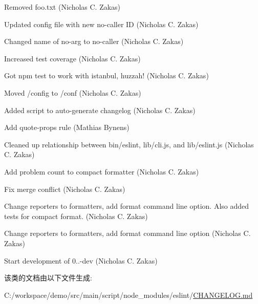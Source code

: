 \begin{DoxyItemize}
\item Removed foo.\+txt (Nicholas C. Zakas)
\item Updated config file with new no-\/caller ID (Nicholas C. Zakas)
\item Changed name of no-\/arg to no-\/caller (Nicholas C. Zakas)
\item Increased test coverage (Nicholas C. Zakas)
\item Got npm test to work with istanbul, huzzah! (Nicholas C. Zakas)
\item Moved /config to /conf (Nicholas C. Zakas)
\item Added script to auto-\/generate changelog (Nicholas C. Zakas)
\item Add {\ttfamily quote-\/props} rule (Mathias Bynens)
\item Cleaned up relationship between bin/eslint, lib/cli.\+js, and lib/eslint.\+js (Nicholas C. Zakas)
\item Add problem count to compact formatter (Nicholas C. Zakas)
\item Fix merge conflict (Nicholas C. Zakas)
\item Change reporters to formatters, add format command line option. Also added tests for compact format. (Nicholas C. Zakas)
\item Change reporters to formatters, add format command line option (Nicholas C. Zakas)
\item Start development of 0..-\/dev (Nicholas C. Zakas) 
\end{DoxyItemize}

该类的文档由以下文件生成\+:\begin{DoxyCompactItemize}
\item 
C\+:/workspace/demo/src/main/script/node\+\_\+modules/eslint/\mbox{\hyperlink{eslint_2_c_h_a_n_g_e_l_o_g_8md}{C\+H\+A\+N\+G\+E\+L\+O\+G.\+md}}\end{DoxyCompactItemize}
